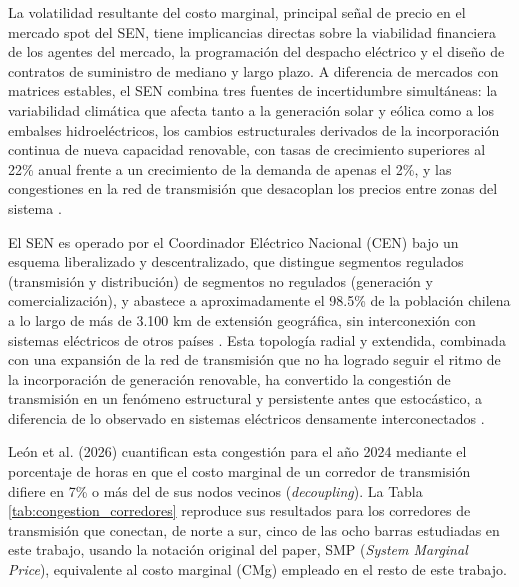 La volatilidad resultante del costo marginal, principal señal de precio en el mercado spot del SEN, tiene implicancias directas sobre la viabilidad financiera de los agentes del mercado, la programación del despacho eléctrico y el diseño de contratos de suministro de mediano y largo plazo. A diferencia de mercados con matrices estables, el SEN combina tres fuentes de incertidumbre simultáneas: la variabilidad climática que afecta tanto a la generación solar y eólica como a los embalses hidroeléctricos, los cambios estructurales derivados de la incorporación continua de nueva capacidad renovable, con tasas de crecimiento superiores al 22\% anual frente a un crecimiento de la demanda de apenas el 2\%, y las congestiones en la red de transmisión que desacoplan los precios entre zonas del sistema \cite{Humphreys}.

El SEN es operado por el Coordinador Eléctrico Nacional (CEN) bajo un esquema liberalizado y descentralizado, que distingue segmentos regulados (transmisión y distribución) de segmentos no regulados (generación y comercialización), y abastece a aproximadamente el 98.5\% de la población chilena a lo largo de más de 3.100 km de extensión geográfica, sin interconexión con sistemas eléctricos de otros países \cite{LeonSMPChile}. Esta topología radial y extendida, combinada con una expansión de la red de transmisión que no ha logrado seguir el ritmo de la incorporación de generación renovable, ha convertido la congestión de transmisión en un fenómeno estructural y persistente antes que estocástico, a diferencia de lo observado en sistemas eléctricos densamente interconectados \cite{LeonSMPChile}.

León et al. (2026) \cite{LeonSMPChile} cuantifican esta congestión para el año 2024 mediante el porcentaje de horas en que el costo marginal de un corredor de transmisión difiere en 7\% o más del de sus nodos vecinos (\textit{decoupling}). La Tabla \ref{tab:congestion_corredores} reproduce sus resultados para los corredores de transmisión que conectan, de norte a sur, cinco de las ocho barras estudiadas en este trabajo, usando la notación original del paper, SMP (\textit{System Marginal Price}), equivalente al costo marginal (CMg) empleado en el resto de este trabajo.

